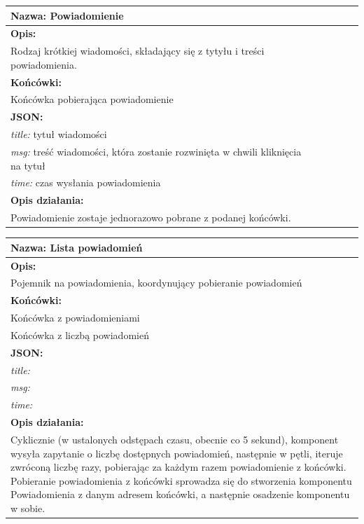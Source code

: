 \documentclass[licencjacka]{pracamgr}
\begin{document}
\begin{tabularx}{\linewidth}{|l|l|c|X|l|}\hline
\textbf{Nazwa:}
Powiadomienie
\\\hline
\textbf{Opis:}\\

Rodzaj krótkiej wiadomości, składający się z tytyłu i treści powiadomienia.\\\hline
\textbf{Końcówki:}\\
Końcówka pobierająca powiadomienie\\\hline
\textbf{JSON:}\\
\textit{title:} tytuł wiadomości\\
\textit{msg:} treść wiadomości, która zostanie rozwinięta w chwili kliknięcia na tytuł\\
\textit{time:} czas wysłania powiadomienia\\\hline
\textbf{Opis działania:}\\
Powiadomienie zostaje jednorazowo pobrane z podanej końcówki.\\\hline
\end{tabularx}

\begin{tabularx}{\linewidth}{|X|}\hline
\textbf{Nazwa:}
Lista powiadomień
\\\hline
\textbf{Opis:}\\

Pojemnik na powiadomienia, koordynujący pobieranie powiadomień\\\hline
\textbf{Końcówki:}\\
Końcówka z powiadomieniami\\
Końcówka z liczbą powiadomień
\\\hline
\textbf{JSON:}\\
\textit{title:}\\
\textit{msg:}\\
\textit{time:} \\ \hline
\textbf{Opis działania:}\\
Cyklicznie (w ustalonych odstępach czasu, obecnie co 5 sekund), komponent
wysyła zapytanie o liczbę dostępnych powiadomień, następnie w pętli, iteruje zwróconą liczbę razy,
pobierając za każdym razem powiadomienie z końcówki. Pobieranie powiadomienia z końcówki sprowadza się
do stworzenia komponentu Powiadomienia z danym adresem końcówki, a następnie osadzenie komponentu w sobie.\\\hline
\end{tabularx}

\end{document}
